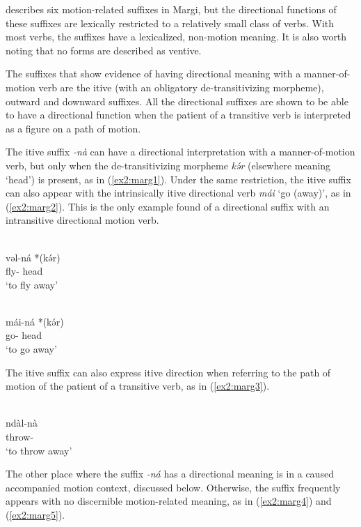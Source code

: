 \citet{hoffmannGrammarMargiLanguage1963} describes six motion-related suffixes in Margi, but the directional functions of these suffixes are lexically restricted to a relatively small class of verbs. With most verbs, the suffixes have a lexicalized, non-motion meaning. It is also worth noting that no forms are described as ventive. 

The suffixes that show evidence of having directional meaning with a manner-of-motion verb are the itive (with an obligatory de-transitivizing morpheme), outward and downward suffixes. All the directional suffixes are shown to be able to have a directional function when the patient of a transitive verb is interpreted as a figure on a path of motion.

The itive suffix \textit{-nà} can have a directional interpretation with a manner-of-motion verb, but only when the de-transitivizing morpheme \textit{kə́r} (elsewhere meaning `head') is present, as in (\ref{ex2:marg1}). Under the same restriction, the itive suffix can also appear with the intrinsically itive directional verb \textit{mái} `go (away)', as in (\ref{ex2:marg2}). This is the only example found of a directional suffix with an intransitive directional motion verb.

\ea\label{ex2:marg1}
 \\
\gll  vəl-ná *(kə́r) \\
fly- head	\\
\glt `to fly away'

\ex\label{ex2:marg2}
 \\
\gll mái-ná *(kə́r)	\\
go- head		\\
\glt `to go away'
\z

The itive suffix can also express itive direction when referring to the path of motion of the patient of a transitive verb, as in (\ref{ex2:marg3}).

\ea\label{ex2:marg3}
 \\
\gll ndàl-nà	\\
throw-		\\
\glt `to throw away'
\z 

The other place where the suffix \textit{-ná} has a directional meaning is in a caused accompanied motion context, discussed below. Otherwise, the suffix frequently appears with no discernible motion-related meaning, as in (\ref{ex2:marg4}) and (\ref{ex2:marg5}).

